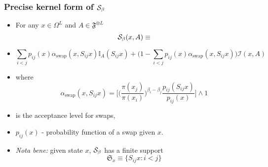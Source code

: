 \begin{frame}
		\frametitle{ Precise kernel form of $\mathcal{S}_{\beta}$}

	\begin{itemize}
		\item[] For any $x \in \Omega^L$ and $A \in \mathfrak{F}^{\otimes L}$ 
	$$\mathcal{S}_{\beta}(x, A) \equiv$$
		\item[]
$$\underset{ i < j}{\sum} p_{ij}(x) \alpha_\text{swap} (x, S_{ij}x) \mathbb{I}_A(S_{ij} x) + \Big( 1 - \underset{ i < j}{\sum} p_{ij}(x) \alpha_\text{swap} (x, S_{ij}x)\Big) \mathcal{I}(x,A)$$

		\item[] where 
$$\alpha_\text{swap}(x,S_{ij} x) = \Big[  \Big(\frac{\pi(x_j)}{\pi(x_i)} \Big)^{\beta_i - \beta_j}  \frac{ p_{ij}(S_{ij} x )}{ p_{ij}( x ) }\Big] \wedge 1$$
		\item[] is the acceptance level for swaps, 
		\item[] $p_{ij}( x )$ - probability function of a swap given $x$. 
		\item[] \emph{Nota bene:} given state $x$, $\mathcal{S}_{\beta}$ has a finite support 
	$$\mathfrak{S}_x \equiv\{ S_{ij} x : i <j \}$$
	\end{itemize}

\end{frame}







